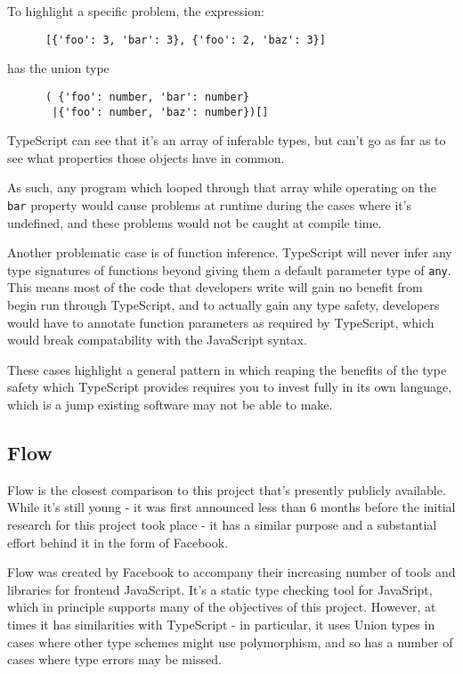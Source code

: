\documentclass[british, twoside]{bhamthesis}
\theoremstyle{definition}
\begin{document}
    To highlight a specific problem, the expression:
    \begin{lstlisting}
      [{'foo': 3, 'bar': 3}, {'foo': 2, 'baz': 3}]
    \end{lstlisting}
    has the union type
    \begin{lstlisting}
      ( {'foo': number, 'bar': number}
       |{'foo': number, 'baz': number})[]
    \end{lstlisting}

    TypeScript can see that it's an array of inferable types, but can't go as far as to see what properties those objects have in common.

    As such, any program which looped through that array while operating on the \texttt {bar} property would cause problems at runtime during the cases where it's undefined, and these problems would not be caught at compile time.

    Another problematic case is of function inference. TypeScript will never infer any type signatures of functions beyond giving them a default parameter type of \texttt{any}. This means most of the code that developers write will gain no benefit from begin run through TypeScript, and to actually gain any type safety, developers would have to annotate function parameters as required by TypeScript, which would break compatability with the JavaScript syntax.

    These cases highlight a general pattern in which reaping the benefits of the type safety which TypeScript provides requires you to invest fully in its own language, which is a jump existing software may not be able to make.

  \subsection{Flow}
    Flow is the closest comparison to this project that's presently publicly available. While it's still young - it was first announced less than 6 months before the initial research for this project took place - it has a similar purpose and a substantial effort behind it in the form of Facebook.

    Flow was created by Facebook to accompany their increasing number of tools and libraries for frontend JavaScript. It's a static type checking tool for JavaSript, which in principle supports many of the objectives of this project. However, at times it has similarities with TypeScript - in particular, it uses Union types in cases where other type schemes might use polymorphism, and so has a number of cases where type errors may be missed.
\end{document}
